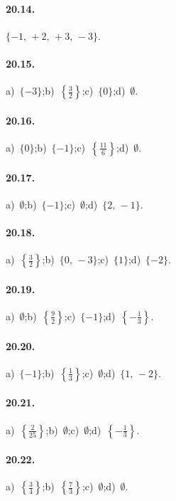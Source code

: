 \begin{multicols}{2}
\paragraph{20.14.}
$\{-1\text{,~}+2\text{,~}+3\text{,~}-3\}$.

\paragraph{20.15.}
a)~$\{-3\}$;\quad b)~$\left\{\frac{3}{2}\right\}$;\quad c)~$\{0\}$;\quad d)~$\emptyset$.

\paragraph{20.16.}
a)~$\{0\}$;\quad b)~$\{-1\}$;\quad c)~$\left\{\frac{11}{6}\right\}$;\quad d)~$\emptyset$.

\paragraph{20.17.}
a)~$\emptyset$;\quad b)~$\{-1\}$;\quad c)~$\emptyset$;\quad d)~$\{2\text{,~}-1\}$.

\paragraph{20.18.}
a)~$\left\{\frac{3}{2}\right\}$;\quad b)~$\{0\text{,~}-3\}$;\quad c)~$\{1\}$;\quad d)~$\{-2\}$.

\paragraph{20.19.}
a)~$\emptyset$;\quad b)~$\left\{\frac{9}{2}\right\}$;\quad c)~$\{-1\}$;\quad d)~$\left\{-{\frac{1}{3}}\right\}$.

\paragraph{20.20.}
a)~$\{-1\}$;\quad b)~$\left\{\frac{1}{3}\right\}$;\quad c)~$\emptyset$;\quad d)~$\{1\text{,~}-2\}$.

\paragraph{20.21.}
a)~$\left\{\frac{2}{25}\right\}$;\quad b)~$\emptyset$;\quad c)~$\emptyset$;\quad d)~$\left\{-{\frac{1}{3}}\right\}$.

\paragraph{20.22.}
a)~$\left\{\frac{3}{4}\right\}$;\quad b)~$\left\{\frac{7}{3}\right\}$;\quad c)~$\emptyset$;\quad d)~$\emptyset$.


\end{multicols}
